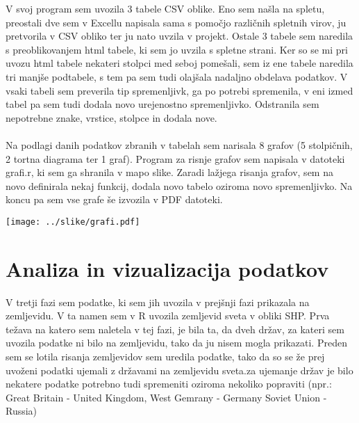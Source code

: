 \documentclass[11pt,a4paper]{article}
\begin{document}
V svoj program sem uvozila 3 tabele CSV oblike. Eno sem našla na spletu, preostali dve sem v Excellu napisala sama s pomočjo različnih spletnih virov, ju pretvorila v CSV obliko ter ju nato uvzila v projekt. Ostale 3 tabele sem naredila s preoblikovanjem html tabele, ki sem jo uvzila s spletne strani. Ker so se mi pri uvozu html tabele nekateri stolpci med seboj pomešali, sem iz ene tabele naredila tri manjše podtabele, s tem pa sem tudi olajšala nadaljno obdelava podatkov. V vsaki tabeli sem preverila tip spremenljivk, ga po potrebi spremenila, v eni izmed tabel pa sem tudi dodala novo urejenostno spremenljivko. Odstranila sem nepotrebne znake, vrstice, stolpce in dodala nove. \\
\\
Na podlagi danih podatkov zbranih v tabelah sem narisala 8 grafov (5 stolpičnih, 2 tortna diagrama ter 1 graf).
Program za risnje grafov sem napisala v datoteki grafi.r, ki sem ga shranila v mapo slike. Zaradi lažjega risanja grafov, sem na novo definirala nekaj funkcij, dodala novo tabelo oziroma novo spremenljivko.
Na koncu pa sem vse grafe še izvozila v PDF datoteki.

\texttt{[image: ../slike/grafi.pdf]}

\newpage

\section{Analiza in vizualizacija podatkov}

V tretji fazi sem podatke, ki sem jih uvozila v prejšnji fazi prikazala na zemljevidu.
V ta namen sem v R uvozila zemljevid sveta v obliki SHP.
Prva težava na katero sem naletela v tej fazi, je bila ta, da dveh držav, za kateri sem uvozila podatke ni bilo na zemljevidu, tako da ju nisem mogla prikazati. 
Preden sem se lotila risanja zemljevidov sem uredila podatke, tako da so se že prej uvoženi podatki ujemali z državami na zemljevidu sveta.za ujemanje držav je bilo nekatere podatke potrebno tudi spremeniti oziroma nekoliko popraviti (npr.: Great Britain - United Kingdom, West Gemrany - Germany Soviet Union - Russia)\\
\\
\end{document}
